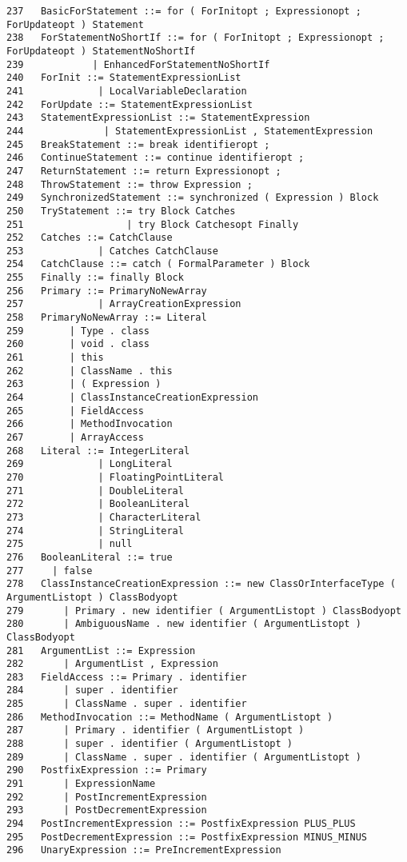 {\begin{verbatim}
237   BasicForStatement ::= for ( ForInitopt ; Expressionopt ; ForUpdateopt ) Statement
238   ForStatementNoShortIf ::= for ( ForInitopt ; Expressionopt ; ForUpdateopt ) StatementNoShortIf
239            | EnhancedForStatementNoShortIf
240   ForInit ::= StatementExpressionList
241             | LocalVariableDeclaration
242   ForUpdate ::= StatementExpressionList
243   StatementExpressionList ::= StatementExpression
244              | StatementExpressionList , StatementExpression
245   BreakStatement ::= break identifieropt ;
246   ContinueStatement ::= continue identifieropt ;
247   ReturnStatement ::= return Expressionopt ;
248   ThrowStatement ::= throw Expression ;
249   SynchronizedStatement ::= synchronized ( Expression ) Block
250   TryStatement ::= try Block Catches
251                  | try Block Catchesopt Finally
252   Catches ::= CatchClause
253             | Catches CatchClause
254   CatchClause ::= catch ( FormalParameter ) Block
255   Finally ::= finally Block
256   Primary ::= PrimaryNoNewArray
257             | ArrayCreationExpression
258   PrimaryNoNewArray ::= Literal
259        | Type . class
260        | void . class
261        | this
262        | ClassName . this
263        | ( Expression )
264        | ClassInstanceCreationExpression
265        | FieldAccess
266        | MethodInvocation
267        | ArrayAccess
268   Literal ::= IntegerLiteral
269             | LongLiteral
270             | FloatingPointLiteral
271             | DoubleLiteral
272             | BooleanLiteral
273             | CharacterLiteral
274             | StringLiteral
275             | null
276   BooleanLiteral ::= true
277     | false
278   ClassInstanceCreationExpression ::= new ClassOrInterfaceType ( ArgumentListopt ) ClassBodyopt
279       | Primary . new identifier ( ArgumentListopt ) ClassBodyopt
280       | AmbiguousName . new identifier ( ArgumentListopt ) ClassBodyopt
281   ArgumentList ::= Expression
282       | ArgumentList , Expression
283   FieldAccess ::= Primary . identifier
284       | super . identifier
285       | ClassName . super . identifier
286   MethodInvocation ::= MethodName ( ArgumentListopt )
287       | Primary . identifier ( ArgumentListopt )
288       | super . identifier ( ArgumentListopt )
289       | ClassName . super . identifier ( ArgumentListopt )
290   PostfixExpression ::= Primary
291       | ExpressionName
292       | PostIncrementExpression
293       | PostDecrementExpression
294   PostIncrementExpression ::= PostfixExpression PLUS_PLUS
295   PostDecrementExpression ::= PostfixExpression MINUS_MINUS
296   UnaryExpression ::= PreIncrementExpression

\end{verbatim}}
